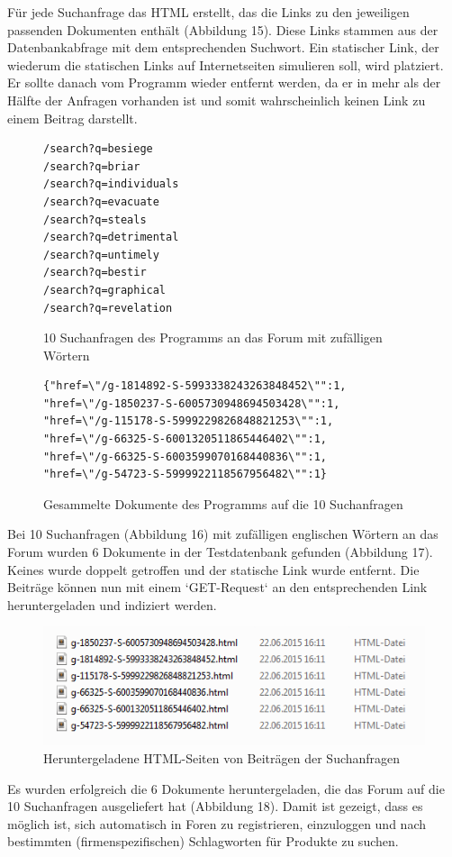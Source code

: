 Für jede Suchanfrage das HTML erstellt, das die Links zu den jeweiligen passenden Dokumenten enthält (Abbildung 15). Diese Links stammen aus der Datenbankabfrage mit dem entsprechenden Suchwort.
Ein statischer Link, der wiederum die statischen Links auf Internetseiten simulieren soll, wird platziert. Er sollte danach vom Programm wieder entfernt werden, da er in mehr als der Hälfte der Anfragen vorhanden ist und somit wahrscheinlich keinen Link zu einem Beitrag darstellt.

\begin{figure}[h!]
\begin{lstlisting}[language=HTML5]
/search?q=besiege
/search?q=briar
/search?q=individuals
/search?q=evacuate
/search?q=steals
/search?q=detrimental
/search?q=untimely
/search?q=bestir
/search?q=graphical
/search?q=revelation
\end{lstlisting}
\caption{10 Suchanfragen des Programms an das Forum mit zufälligen Wörtern}
\end{figure}

\begin{figure}[h!]
\begin{lstlisting}[language=HTML5]
{"href=\"/g-1814892-S-5993338243263848452\"":1,
"href=\"/g-1850237-S-6005730948694503428\"":1,
"href=\"/g-115178-S-5999229826848821253\"":1,
"href=\"/g-66325-S-6001320511865446402\"":1,
"href=\"/g-66325-S-6003599070168440836\"":1,
"href=\"/g-54723-S-5999922118567956482\"":1}
\end{lstlisting}
\caption{Gesammelte Dokumente des Programms auf die 10 Suchanfragen}
\end{figure}

Bei 10 Suchanfragen (Abbildung 16) mit zufälligen englischen Wörtern an das Forum wurden 6 Dokumente in der Testdatenbank gefunden (Abbildung 17). Keines wurde doppelt getroffen und der statische Link wurde entfernt. Die Beiträge können nun mit einem `GET-Request` an den entsprechenden Link heruntergeladen und indiziert werden.
\newpage

\begin{figure}[h!]
\includegraphics{./images/postdownload.png}
\caption{Heruntergeladene HTML-Seiten von Beiträgen der Suchanfragen}
\end{figure}


Es wurden erfolgreich die 6 Dokumente heruntergeladen, die das Forum auf die 10 Suchanfragen ausgeliefert hat (Abbildung 18).
Damit ist gezeigt, dass es möglich ist, sich automatisch in Foren zu registrieren, einzuloggen und nach bestimmten (firmenspezifischen) Schlagworten für Produkte zu suchen.
\newpage


